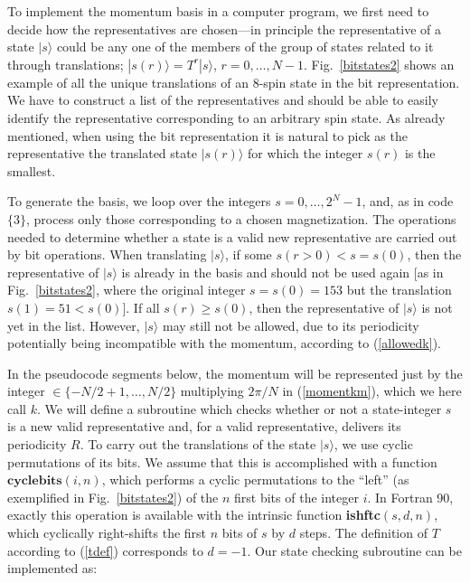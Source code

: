 \documentclass[draft,numberedheadings]{aipproc}
\begin{document}
To implement the momentum basis in a computer program, we first need to decide how the representatives are chosen---in principle the representative of 
a state $|s\rangle$ could be any one of the members of the group of states related to it through translations; $|s(r)\rangle=T^r|s\rangle$, 
$r=0,\ldots,N-1$. Fig.~\ref{bitstates2} shows an example of all the unique translations of an 8-spin state in the bit representation.
We have to construct a list of the representatives and should be able to easily identify the representative corresponding to an arbitrary 
spin state. As already mentioned, when using the bit representation it is natural to pick as the representative the translated state $|s(r)\rangle$ 
for which the integer $s(r)$ is the smallest. 

To generate the basis, we loop over the integers $s=0,\ldots,2^N-1$, and, as in code $\{3\}$, process only those corresponding to a chosen 
magnetization. The operations needed to determine whether a state is a valid new representative are carried out by bit operations. When translating 
$|s\rangle$, if some $s(r>0) < s=s(0)$, then the representative of $|s\rangle$ is already in the basis and should 
not be used again [as in Fig.~\ref{bitstates2}, where the original integer $s=s(0)=153$ but the translation $s(1)=51<s(0)$]. If all $s(r) \ge s(0)$, 
then the representative of $|s\rangle$ is not yet in the list. However, $|s\rangle$ may still not be allowed, due to its periodicity potentially 
being incompatible with the momentum, according to (\ref{allowedk}).

In the pseudocode segments below, the momentum will be represented just by the integer $\in \{-N/2+1,\ldots, N/2\}$ multiplying $2\pi/N$ in (\ref{momentkm}), which we 
here call $k$. We will define a subroutine which checks whether or not a state-integer $s$ is a new valid representative and, for a valid representative, 
delivers its periodicity $R$. To carry out the translations of the state $|s\rangle$, we use cyclic permutations of its bits. We assume that this is accomplished 
with a function $\mathbf{cyclebits}(i,n)$, which performs a cyclic permutations to the ``left'' (as exemplified in Fig.~\ref{bitstates2}) of the $n$ first bits 
of the integer $i$. In Fortran 90, exactly this operation is available with the intrinsic function {\bf ishftc}$(s,d,n)$, which cyclically right-shifts the 
first $n$ bits of $s$ by $d$ steps. The definition of $T$ according to (\ref{tdef}) corresponds to $d=-1$. Our state checking subroutine can be implemented as:
\end{document}
